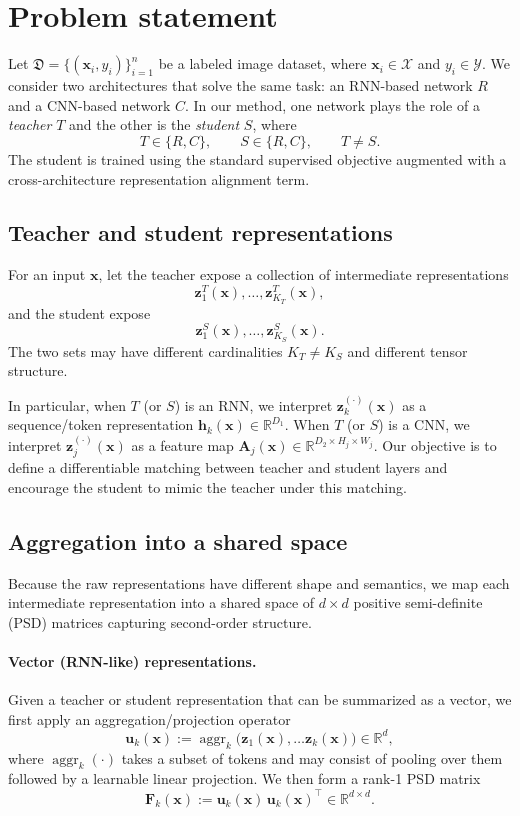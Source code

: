 \documentclass[11pt]{article}
\begin{document}
\section{Problem statement}

Let \(\mathfrak{D}=\{(\mathbf{x}_i,y_i)\}_{i=1}^n\) be a labeled image dataset, where \(\mathbf{x}_i\in\mathcal{X}\) and \(y_i\in\mathcal{Y}\).
We consider two architectures that solve the same task: an RNN-based network \(R\) and a CNN-based network \(C\).
In our method, one network plays the role of a \emph{teacher} \(T\) and the other is the \emph{student} \(S\), where
\[
T\in\{R,C\},\qquad S\in\{R,C\},\qquad T\neq S.
\]
The student is trained using the standard supervised objective augmented with a cross-architecture representation alignment term.

\subsection{Teacher and student representations}

For an input \(\mathbf{x}\), let the teacher expose a collection of intermediate representations
\[
\mathbf{z}^{T}_1(\mathbf{x}),\dots,\mathbf{z}^{T}_{K_T}(\mathbf{x}),
\]
and the student expose
\[
\mathbf{z}^{S}_1(\mathbf{x}),\dots,\mathbf{z}^{S}_{K_S}(\mathbf{x}).
\]
The two sets may have different cardinalities \(K_T\neq K_S\) and different tensor structure.

In particular, when \(T\) (or \(S\)) is an RNN, we interpret \(\mathbf{z}^{(\cdot)}_k(\mathbf{x})\) as a sequence/token representation
\(\mathbf{h}_k(\mathbf{x})\in\mathbb{R}^{D_1}\). When \(T\) (or \(S\)) is a CNN, we interpret \(\mathbf{z}^{(\cdot)}_j(\mathbf{x})\) as a feature map \(\mathbf{A}_j(\mathbf{x})\in\mathbb{R}^{D_2\times H_j\times W_j}\).
Our objective is to define a differentiable matching between teacher and student layers and encourage the student to mimic the teacher under this matching.

\subsection{Aggregation into a shared space}

Because the raw representations have different shape and semantics, we map each intermediate representation into a shared space of
\(d\times d\) positive semi-definite (PSD) matrices capturing second-order structure.

\paragraph{Vector (RNN-like) representations.}
Given a teacher or student representation that can be summarized as a vector, we first apply an aggregation/projection operator
\[
\mathbf{u}_k(\mathbf{x})
:=\operatorname{aggr}_k\big(\mathbf{z}_1(\mathbf{x}), \dots\mathbf{z}_k(\mathbf{x})\big)\in\mathbb{R}^{d},
\]
where \(\operatorname{aggr}_k(\cdot)\) takes a subset of tokens and may consist of pooling over them followed by a learnable linear projection. We then form a rank-1 PSD matrix
\[
\mathbf{F}_k(\mathbf{x}) := \mathbf{u}_k(\mathbf{x})\,\mathbf{u}_k(\mathbf{x})^\top \in \mathbb{R}^{d\times d}.
\]
\end{document}
